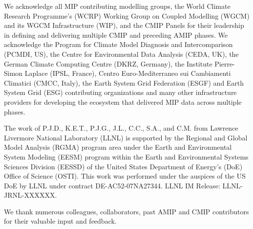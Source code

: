 \documentclass[gmd, preprint]{copernicus}
\def\cred#1{{\color{red}#1}}
\begin{document}
\begin{acknowledgements}

We acknowledge all MIP contributing modelling groups, the World Climate Research Programme's (WCRP) Working Group on Coupled Modelling (WGCM) and its WGCM Infrastructure (WIP), and the CMIP Panels for their leadership in defining and delivering multiple CMIP and preceding AMIP phases. We acknowledge the Program for Climate Model Diagnosis and Intercomparison (PCMDI, US), the Centre for Environmental Data Analysis (CEDA, UK), the German Climate Computing Centre (DKRZ, Germany), the Institute Pierre-Simon Laplace (IPSL, France), Centro Euro-Mediterraneo sui Cambiamenti Climatici (CMCC, Italy), the Earth System Grid Federation (ESGF) and Earth System Grid (ESG) contributing organizations and many other infrastructure providers for developing the ecosystem that delivered MIP data across multiple phases.

The work of P.J.D., K.E.T., P.J.G., J.L., C.C., S.A., and C.M. from Lawrence Livermore National Laboratory (LLNL) is supported by the Regional and Global Model Analysis (RGMA) program area under the Earth and Environmental System Modeling (EESM) program within the Earth and Environmental Systems Sciences Division (EESSD) of the United States Department of Energy’s (DoE) Office of Science (OSTI). This work was performed under the auspices of the US DoE by LLNL under contract DE-AC52-07NA27344. LLNL IM Release: \cred{LLNL-JRNL-XXXXXX}.

We thank numerous colleagues, collaborators, past AMIP and CMIP contributors for their valuable input and feedback.

\end{acknowledgements}







\end{document}
